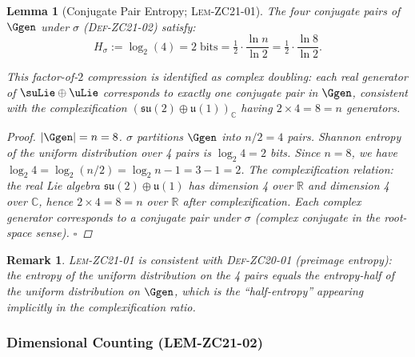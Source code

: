 \documentclass[12pt, a4paper]{article}
\newtheorem{lemma}{Lemma}[section]
\newtheorem{remark}{Remark}[section]
\begin{document}
\begin{lemma}[Conjugate Pair Entropy; \textsc{Lem-ZC21-01}]
\label{zc21:lem:entropy}
The four conjugate pairs of $\Ggen$ under $\sigma$
(\textsc{Def-ZC21-02}) satisfy:
\begin{equation}
  H_\sigma := \log_2(4) = 2 \;\text{bits}
  = \tfrac{1}{2} \cdot \frac{\ln n}{\ln 2}
  = \tfrac{1}{2} \cdot \frac{\ln 8}{\ln 2}.
  \tag{LEM-ZC21-01}
\end{equation}

This factor-of-$2$ compression is identified as \emph{complex doubling}:
each real generator of $\suLie \oplus \uLie$ corresponds to
exactly one conjugate pair in $\Ggen$,
consistent with the complexification
$(\mathfrak{su}(2)\oplus\mathfrak{u}(1))_\mathbb{C}$
having $2 \times 4 = 8 = n$ generators.

\begin{proof}
$|\Ggen| = n = 8$.
$\sigma$ partitions $\Ggen$ into $n/2 = 4$ pairs.
Shannon entropy of the uniform distribution over 4 pairs is $\log_2 4 = 2$ bits.
Since $n = 8$, we have $\log_2 4 = \log_2(n/2) = \log_2 n - 1 = 3-1 = 2$.
The complexification relation: the real Lie algebra
$\mathfrak{su}(2)\oplus\mathfrak{u}(1)$ has dimension 4 over $\mathbb{R}$
and dimension 4 over $\mathbb{C}$, hence $2\times 4 = 8 = n$
over $\mathbb{R}$ after complexification.
Each complex generator corresponds to a conjugate pair under $\sigma$
(complex conjugate in the root-space sense).
\hfill$\square$
\end{proof}
\end{lemma}

\begin{remark}
\textsc{Lem-ZC21-01} is consistent with \textsc{Def-ZC20-01} (preimage entropy):
the entropy of the uniform distribution on the 4 pairs equals the
entropy-half of the uniform distribution on $\Ggen$,
which is the ``half-entropy'' appearing implicitly in the complexification
ratio.
\end{remark}

\subsubsection{Dimensional Counting (LEM-ZC21-02)}
\end{document}
